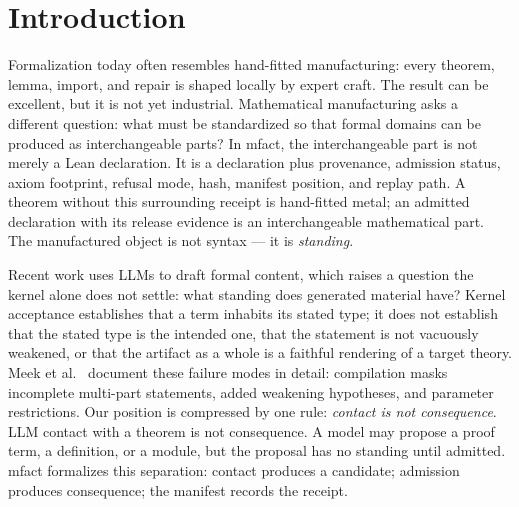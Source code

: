 \documentclass[11pt]{article}
\begin{document}
\begin{abstract}
The result is not a claim that arbitrary generated mathematics is
automatically correct. Rice-style undecidability is respected rather than
ignored: MathProofOps replaces the impossible question ``is this arbitrary
generated artifact semantically correct?'' with the bounded, replayable
question ``did this candidate pass the declared admission gate inside
boundary \(B\)?'' More generally, public ontologies supply a domain's
nouns; MathProofOps supplies standing. The method generalizes from process
intelligence to any ontology-bearing field whose artifacts can be
projected, admitted, receipted, and replayed. The evaluation section of
this paper is generated from the release manifest rather than written by
hand, and a kernel-checked \emph{Standing Quadrature} witness closes the
cross-product between the declaration catalog, the admitted corpus, the
release manifest, the process evidence, and this paper's claims. We report
exactly what was proven, what remains stated, what was refused, and what
the release boundary excludes.
\end{abstract}

\section{Introduction}

Formalization today often resembles hand-fitted manufacturing: every
theorem, lemma, import, and repair is shaped locally by expert craft. The
result can be excellent, but it is not yet industrial. Mathematical
manufacturing asks a different question: what must be standardized so that
formal domains can be produced as interchangeable parts? In
\textsf{mfact}, the interchangeable part is not merely a Lean declaration.
It is a declaration plus provenance, admission status, axiom footprint,
refusal mode, hash, manifest position, and replay path. A theorem without
this surrounding receipt is hand-fitted metal; an admitted declaration
with its release evidence is an interchangeable mathematical part. The
manufactured object is not syntax --- it is \emph{standing}.

Recent work uses LLMs to draft formal content, which raises a question
the kernel alone does not settle: what standing does generated material
have? Kernel acceptance establishes that a term inhabits its stated type;
it does not establish that the stated type is the intended one, that the
statement is not vacuously weakened, or that the artifact as a whole is a
faithful rendering of a target theory. Meek et
al.~\cite{meek2026formalizing} document these failure modes in detail:
compilation masks incomplete multi-part statements, added weakening
hypotheses, and parameter restrictions. Our position is compressed by one
rule: \emph{contact is not consequence}. LLM contact with a theorem is
not consequence. A model may propose a proof term, a definition, or a
module, but the proposal has no standing until admitted. \textsf{mfact}
formalizes this separation: contact produces a candidate; admission
produces consequence; the manifest records the receipt.
\end{document}
